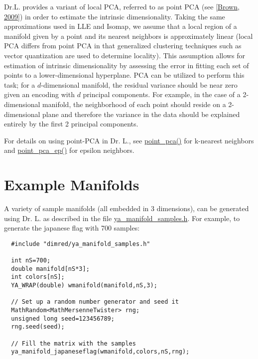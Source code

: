 Dr.L. provides a variant of local PCA, referred to as point PCA (see \hyperlink{index_ref}{\mbox{[}Brown, 2009\mbox{]}}) in order to estimate the intrinsic dimensionality. Taking the same approximations used in LLE and Isomap, we assume that a local region of a manifold given by a point and its nearest neighbors is approximately linear (local PCA differs from point PCA in that generalized clustering techniques such as vector quantization are used to determine locality). This assumption allows for estimation of intrinsic dimensionality by assessing the error in fitting each set of points to a lower-dimensional hyperplane. PCA can be utilized to perform this task; for a $d$-dimensional manifold, the residual variance should be near zero given an encoding with $d$ principal components. For example, in the case of a 2-dimensional manifold, the neighborhood of each point should reside on a 2-dimensional plane and therefore the variance in the data should be explained entirely by the first 2 principal components.

For details on using point-PCA in Dr. L., see \hyperlink{ya__dim__redfun_8h_a0}{point\_\-pca()} for k-nearest neighbors and \hyperlink{ya__dim__redfun_8h_a2}{point\_\-pca\_\-ep()} for epsilon neighbors.

\par
 \par
 \hypertarget{index_em}{}\section{Example Manifolds}\label{index_em}
A variety of sample manifolds (all embedded in 3 dimensions), can be generated using Dr. L. as described in the file \hyperlink{ya__manifold__samples_8h}{ya\_\-manifold\_\-samples.h}. For example, to generate the japanese flag with 700 samples:



\footnotesize\begin{verbatim}  #include "dimred/ya_manifold_samples.h"

  int nS=700;
  double manifold[nS*3];
  int colors[nS];
  YA_WRAP(double) wmanifold(manifold,nS,3);
  
  // Set up a random number generator and seed it
  MathRandom<MathMersenneTwister> rng;
  unsigned long seed=123456789;
  rng.seed(seed);

  // Fill the matrix with the samples
  ya_manifold_japaneseflag(wmanifold,colors,nS,rng);
\end{verbatim}
\normalsize


